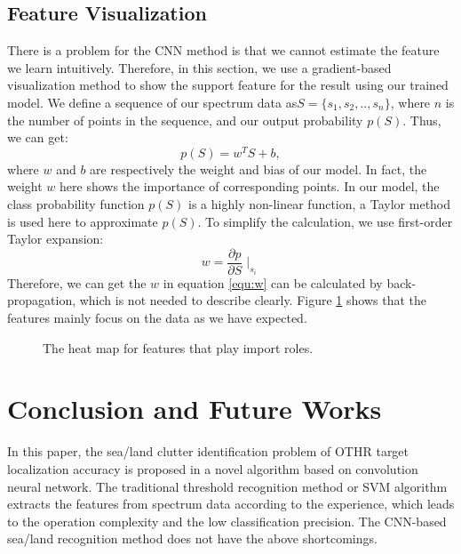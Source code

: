 %
\subsection{Feature Visualization}
There is a problem for the CNN method is that we cannot estimate the feature we learn intuitively. Therefore, in this section, we use a gradient-based visualization method to show the support feature for the result using our trained model. We define a sequence of our spectrum data as$ S = \{s_1, s_2, .., s_n\} $, where $n$ is the number of points in the sequence, and our output probability $p(S)$. Thus, we can get:
\begin{equation}
p(S) = w^TS+b,
\end{equation}
where $w$ and $b$ are respectively the weight and bias of our model. In fact, the weight $w$ here shows the importance of corresponding points. In our model, the class probability function $p(S)$ is a highly non-linear function, a Taylor method is used here to approximate $p(S)$. To simplify the calculation, we use first-order Taylor expansion:
\begin{equation}
w = \frac{\partial{p}}{\partial{S}}{\mid}_{s_i}
\label{equ:w}
\end{equation}
Therefore, we can get the $w$ in equation \ref{equ:w} can be calculated by back-propagation, which is not needed to describe clearly. Figure \ref{fig:vis} shows that the features mainly focus on the data as we have expected.
\begin{figure}[!t]
	\centering
	\caption{The heat map for features that play import roles.}
	\label{fig:vis}
\end{figure}
\section{Conclusion and Future Works}
In this paper, the sea/land clutter identification problem of OTHR target localization accuracy is proposed in a novel algorithm based on convolution neural network. The traditional threshold recognition method or SVM algorithm extracts the features from spectrum data according to the experience, which leads to the operation complexity and the low classification precision. The CNN-based sea/land recognition method does not have the above shortcomings.

